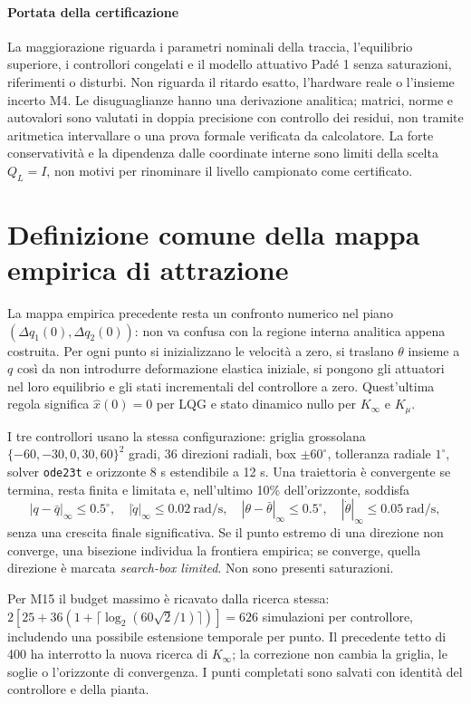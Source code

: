 \paragraph{Portata della certificazione}
La maggiorazione riguarda i parametri nominali della traccia, l'equilibrio
superiore, i controllori congelati e il modello attuativo Padé 1 senza
saturazioni, riferimenti o disturbi. Non riguarda il ritardo esatto,
l'hardware reale o l'insieme incerto M4. Le disuguaglianze hanno una
derivazione analitica; matrici, norme e autovalori sono valutati in doppia
precisione con controllo dei residui, non tramite aritmetica intervallare
o una prova formale verificata da calcolatore. La forte conservatività e la
dipendenza dalle coordinate interne sono limiti della scelta $Q_L=I$,
non motivi per rinominare il livello campionato come certificato.

\section{Definizione comune della mappa empirica di attrazione}
La mappa empirica precedente resta un confronto numerico nel piano $(\Delta q_1(0),\Delta q_2(0))$: non va confusa con la regione interna analitica appena costruita. Per ogni punto si inizializzano le velocità a zero, si traslano $\theta$ insieme a $q$ così da non introdurre deformazione elastica iniziale, si pongono gli attuatori nel loro equilibrio e gli stati incrementali del controllore a zero. Quest'ultima regola significa $\hat x(0)=0$ per LQG e stato dinamico nullo per $K_\infty$ e $K_\mu$.

I tre controllori usano la stessa configurazione: griglia grossolana $\{-60,-30,0,30,60\}^2$ gradi, 36 direzioni radiali, box $\pm60^\circ$, tolleranza radiale $1^\circ$, solver \texttt{ode23t} e orizzonte 8 s estendibile a 12 s. Una traiettoria è convergente se termina, resta finita e limitata e, nell'ultimo 10\% dell'orizzonte, soddisfa
\[
|q-\bar q|_\infty\le0.5^\circ,\quad
|\dot q|_\infty\le0.02\ \mathrm{rad/s},\quad
|\theta-\bar\theta|_\infty\le0.5^\circ,\quad
|\dot\theta|_\infty\le0.05\ \mathrm{rad/s},
\]
senza una crescita finale significativa. Se il punto estremo di una direzione non converge, una bisezione individua la frontiera empirica; se converge, quella direzione è marcata \emph{search-box limited}. Non sono presenti saturazioni.

Per M15 il budget massimo è ricavato dalla ricerca stessa:
$2[25+36(1+\lceil\log_2(60\sqrt{2}/1)\rceil)]=626$ simulazioni
per controllore, includendo una possibile estensione temporale per punto.
Il precedente tetto di 400 ha interrotto la nuova ricerca di $K_\infty$;
la correzione non cambia la griglia, le soglie o l'orizzonte di convergenza.
I punti completati sono salvati con identità del controllore e della pianta.

